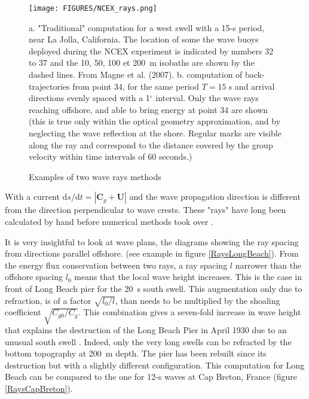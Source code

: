 \begin{figure}
\centerline{\texttt{[image: FIGURES/NCEX\_rays.png]}}
  
    \caption{Examples of two wave rays methods}{a. "Traditional" computation for a west swell with a 15-s period,
    near La Jolla, California. The location of some the wave buoys deployed during the NCEX experiment is indicated
    by numbers 32 to 37 and the  10, 50, 100 et 200~m isobaths are shown by the dashed lines. From Magne et al. 
    (2007\nocite{Magne&al.2007}). b. computation of back-trajectories from point 34, for the same 
    period $T=15~s$ and arrival directions evenly spaced with a 1$^\circ$ interval. Only the wave rays reaching
    offshore, and able to bring energy at point 34 are shown (this is true only within the optical geometry approximation,
    and by neglecting the wave reflection at the shore. Regular marks are visible along the ray and correspond to
    the distance covered by the group velocity within time intervals of 60 seconds.)}
  
   \label{RaysLaJolla}
  \end{figure}

With a current $\mathrm{d}s/\mathrm{d}t=\left|{\mathbf C}_g+{\mathbf
U}\right|$ and the wave propagation direction is different from the direction
perpendicular to wave crests. These "rays" have long been calculated by hand
\citep{Munk&Traylor1947} before numerical methods took over \cite{Dobson1967}.
 
 It is very insightful to look at wave plans, the diagrams showing the ray spacing from directions parallel offshore. (see example in figure
 \ref{RaysLongBeach}). From the energy flux conservation between two rays, a ray spacing $l$ narrower than the offshore spacing $l_0$ means 
 that the local wave height increases. This is the case in front of Long Beach pier
 for the 20~s south swell. This augmentation only due to refraction, is of a factor $\sqrt{l_0/l}$,
 than needs to be multiplied by the shoaling coefficient $\sqrt{C_{g0}/C_g}$. This combination gives a seven-fold increase in wave height that explains the destruction of the Long Beach Pier
in April 1930 due to an unusual south swell \citep{Lacombe1950}. Indeed, only the very long swells can be refracted by the bottom topography at 200~m depth.
The pier has been rebuilt since its destruction but with a slightly different configuration.
This computation for Long Beach can be compared to the one for 12-s waves at Cap Breton, France (figure \ref{RaysCapBreton}). 

